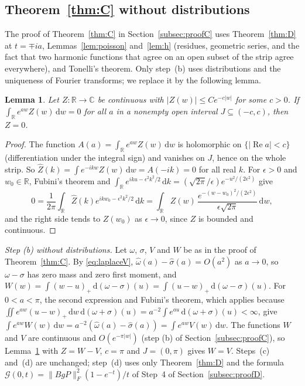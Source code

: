 \documentclass[11pt]{amsart}
\newtheorem{lemma}[theorem]{Lemma}
\theoremstyle{definition}
\theoremstyle{remark}
\numberwithin{equation}{section}
\newcommand{\R}{\mathbb{R}}
\newcommand{\C}{\mathbb{C}}
\renewcommand{\Re}{\operatorname{Re}}
\newcommand{\cG}{\mathcal{G}}
\newcommand{\dd}{\,\mathrm{d}}
\begin{document}
\subsection{Theorem~\ref{thm:C} without distributions}
The proof of Theorem~\ref{thm:C} in Section~\ref{subsec:proofC} uses Theorem~\ref{thm:D} at $t=\mp ia$, Lemmas~\ref{lem:poisson}
and~\ref{lem:h} (residues, geometric series, and the fact that two harmonic functions that agree on an open subset of the
strip agree everywhere), and Tonelli's theorem. Only step~(b) uses distributions and the uniqueness of Fourier
transforms; we replace it by the following lemma.

\begin{lemma}\label{lem:U}
Let $Z\colon\R\to\C$ be continuous with $|Z(w)|\le Ce^{-c|w|}$ for some $c>0$. If $\int_\R e^{aw}Z(w)\dd w=0$ for all $a$ in a
nonempty open interval $J\subseteq(-c,c)$, then $Z=0$.
\end{lemma}

\begin{proof}
The function $A(a)=\int_\R e^{aw}Z(w)\dd w$ is holomorphic on $\{|\Re a|<c\}$ (differentiation under the integral sign) and
vanishes on $J$, hence on the whole strip. So $\hat Z(k)=\int e^{-ikw}Z(w)\dd w=A(-ik)=0$ for all real $k$. For $\epsilon>0$ and
$w_0\in\R$, Fubini's theorem and $\int_\R e^{iku-\epsilon^2k^2/2}\dd k=(\sqrt{2\pi}/\epsilon)e^{-u^2/(2\epsilon^2)}$ give
\[
0=\frac1{2\pi}\int_\R\hat Z(k)e^{ikw_0-\epsilon^2k^2/2}\dd k=\int_\R Z(w)\,\frac{e^{-(w-w_0)^2/(2\epsilon^2)}}{\epsilon\sqrt{2\pi}}\dd w ,
\]
and the right side tends to $Z(w_0)$ as $\epsilon\to0$, since $Z$ is bounded and continuous.
\end{proof}

\emph{Step (b) without distributions.} Let $\omega$, $\sigma$, $V$ and $W$ be as in the proof of Theorem~\ref{thm:C}. By
\eqref{eq:laplaceV}, $\hat\omega(a)-\hat\sigma(a)=O(a^2)$ as $a\to0$, so $\omega-\sigma$ has zero mass and zero first moment,
and $W(w)=\int(w-u)_+\dd(\omega-\sigma)(u)=\int(u-w)_+\dd(\omega-\sigma)(u)$. For $0<a<\pi$, the second expression and Fubini's
theorem, which applies because $\iint e^{aw}(u-w)_+\dd w\dd(\omega+\sigma)(u)=a^{-2}\int e^{au}\dd(\omega+\sigma)(u)<\infty$, give
$\int e^{aw}W(w)\dd w=a^{-2}(\hat\omega(a)-\hat\sigma(a))=\int e^{aw}V(w)\dd w$. The functions $W$ and $V$ are continuous and
$O(e^{-\pi|w|})$ (step (b) of Section~\ref{subsec:proofC}), so Lemma~\ref{lem:U} with $Z=W-V$, $c=\pi$ and $J=(0,\pi)$ gives
$W=V$. Steps~(c) and~(d) are unchanged; step~(d) uses only Theorem~\ref{thm:D} and the formula
$\cG(0,t)=\|BgP\|_F^2(1-e^{-t})/t$ of Step~4 of Section~\ref{subsec:proofD}.
\end{document}
